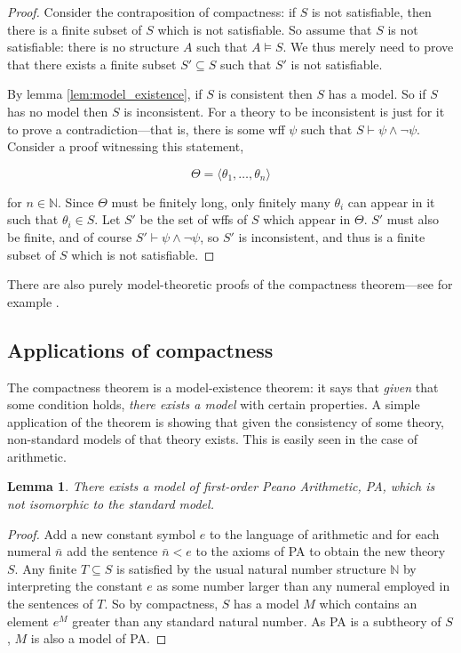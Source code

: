 \documentclass[10pt, a4paper, oneside]{article}
\theoremstyle{definition}
\theoremstyle{remark}
\theoremstyle{plain}
\newtheorem{lem}[thm]{Lemma}
\theoremstyle{plain}
\begin{document}
\begin{proof}
    Consider the contraposition of compactness: if $S$ is not satisfiable, then
    there is a finite subset of $S$ which is not satisfiable. So assume that $S$
    is not satisfiable: there is no structure $A$ such that $A \models S$. We
    thus merely need to prove that there exists a finite subset $S' \subseteq S$
    such that $S'$ is not satisfiable.
    
    By lemma \ref{lem:model_existence}, if $S$ is consistent then $S$ has a
    model. So if $S$ has no model then $S$ is inconsistent. For a theory to be
    inconsistent is just for it to prove a contradiction---that is, there is
    some wff $\psi$ such that $S \vdash \psi \wedge \neg\psi$. Consider a proof
    witnessing this statement,
    
    \begin{equation}
        \Theta = \langle \theta_1, \dotsc, \theta_n \rangle
    \end{equation}
    
    for $n \in \mathbb{N}$. Since $\Theta$ must be finitely long, only finitely
    many $\theta_i$ can appear in it such that $\theta_i \in S$. Let $S'$ be the
    set of wffs of $S$ which appear in $\Theta$. $S'$ must also be finite, and
    of course $S' \vdash \psi \wedge \neg\psi$, so $S'$ is inconsistent, and
    thus is a finite subset of $S$ which is not satisfiable.
\end{proof}

There are also purely model-theoretic proofs of the compactness theorem---see
for example \citet[pp. 125--127]{hodges1997}.

\subsection{Applications of compactness}

The compactness theorem is a model-existence theorem: it says that \emph{given}
that some condition holds, \emph{there exists a model} with certain properties.
A simple application of the theorem is showing that given the consistency of
some theory, non-standard models of that theory exists. This is easily seen in
the case of arithmetic.

\begin{lem}
    There exists a model of first-order Peano Arithmetic, PA, which is not
    isomorphic to the standard model.
\end{lem}

\begin{proof}
    Add a new constant symbol $e$ to the language of arithmetic and for each
    numeral $\bar{n}$ add the sentence $\bar{n} < e$ to the axioms of PA to
    obtain the new theory $S$. Any finite $T \subseteq S$ is satisfied by the
    usual natural number structure $\mathbb{N}$ by interpreting the constant $e$
    as some number larger than any numeral employed in the sentences of $T$. So
    by compactness, $S$ has a model $M$ which contains an element $e^M$ greater
    than any standard natural number. As PA is a subtheory of $S$, $M$ is also a
    model of PA.
\end{proof}
\end{document}
